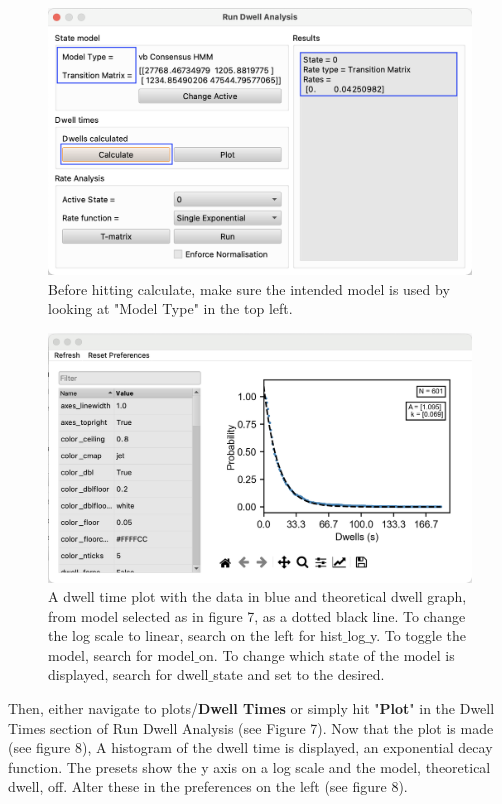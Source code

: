 \documentclass[11pt,a5paper,footinclude=true,headinclude=true]{scrbook} %
\begin{document}
\begin{figure} 
    \centering
    \includegraphics[scale=0.3]{Run Dwell AnalysisFigure.png}
    \caption{Before hitting calculate, make sure the intended model is used by looking at "Model Type" in the top left.} 
    \label{fig:my_label}
\end{figure}
\begin{figure} 
    \centering
    \includegraphics [scale=0.32]{DwellTime Plot.png}
    \caption{A dwell time plot with the data in blue and theoretical dwell graph, from model selected as in figure 7, as a dotted black line. To change the log scale to linear, search on the left for hist$\_$log$\_$y. To toggle the model, search for model$\_$on. To change which state of the model is displayed, search for dwell$\_$state and set to the desired.}
    \label{fig:my_label}
\end{figure}


 
Then, either navigate to plots/\textbf{Dwell Times} or simply hit "\textbf{Plot}" in the Dwell Times section of Run Dwell Analysis (see Figure 7). Now that the plot is made (see figure 8), A histogram of the dwell time is displayed, an exponential decay function. The presets show the y axis on a log scale and the model, theoretical dwell, off. Alter these in the preferences on the left (see figure 8). 
\end{document}
